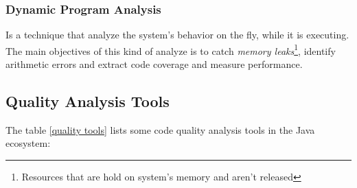 \subsubsection{Dynamic Program Analysis}
Is a technique that analyze the system's behavior on the fly, while it is executing. The main objectives of this kind of analyze is to catch \textit{memory leaks}\footnote{Resources that are hold on system's memory and aren't released}, identify arithmetic errors and extract code coverage and measure performance. 


\subsection{Quality Analysis Tools}
\label{ch2:qatools}
The table \ref{quality tools} lists some code quality analysis tools in the Java ecosystem:

